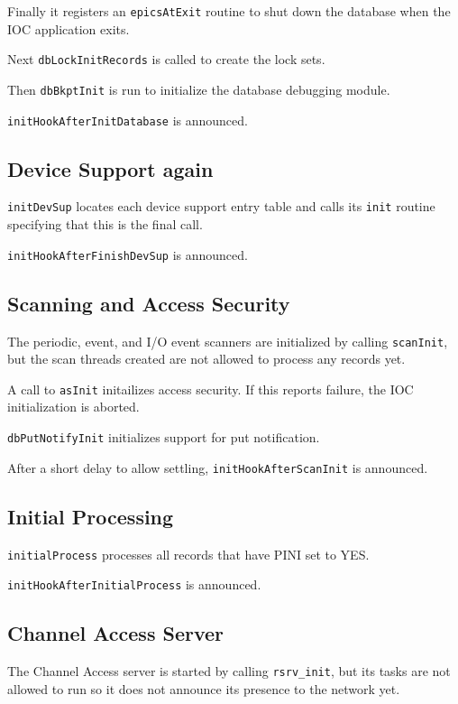 Finally it registers an \verb|epicsAtExit| routine to shut down the database when the IOC application exits.

Next \verb|dbLockInitRecords| is called to create the lock sets.

Then \verb|dbBkptInit| is run to initialize the database debugging module.

\verb|initHookAfterInitDatabase| is announced.

\subsection{Device Support again}

\verb|initDevSup| locates each device support entry table and calls its \verb|init| routine specifying that this is the final call.

\verb|initHookAfterFinishDevSup| is announced.

\subsection{Scanning and Access Security}

The periodic, event, and I/O event scanners are initialized by calling \verb|scanInit|, but the scan threads created are not 
allowed to process any records yet.

A call to \verb|asInit| initailizes access security. If this reports failure, the IOC initialization is aborted.

\verb|dbPutNotifyInit| initializes support for put notification.

After a short delay to allow settling, \verb|initHookAfterScanInit| is announced.

\subsection{Initial Processing}

\verb|initialProcess| processes all records that have PINI set to YES.

\verb|initHookAfterInitialProcess| is announced.

\subsection{Channel Access Server}

The Channel Access server is started by calling \verb|rsrv_init|, but its tasks are not allowed to run so it does not announce 
its presence to the network yet.

